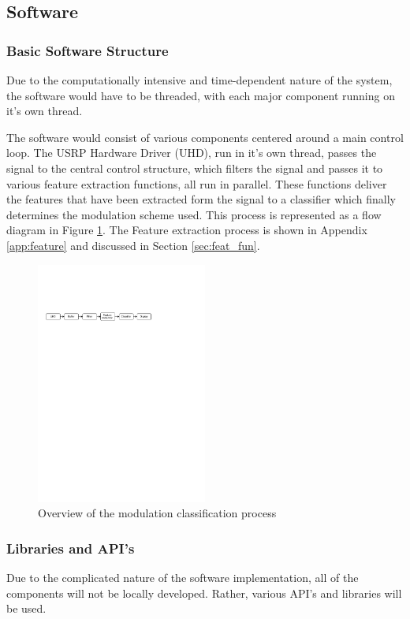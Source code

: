 \documentclass[10pt,twocolumn]{witseiepaper}
\begin{document}
	\subsection{Software}
		\subsubsection{Basic Software Structure}
			Due to the computationally intensive and time-dependent nature of the system, the software would have to be threaded, with each major component running on it's own thread.

			The software would consist of various components centered around a main control loop. The USRP Hardware Driver (UHD), run in it's own thread, passes the signal to the central control structure, which filters the signal and passes it to various feature extraction functions, all run in parallel. These functions deliver the features that have been extracted form the signal to a classifier which finally determines the modulation scheme used. This process is represented as a flow diagram in Figure \ref{fig:sw_overview}. The Feature extraction process is shown in Appendix \ref{app:feature} and discussed in Section \ref{sec:feat_fun}.

			\begin{figure}[h!]
				\centering
				\includegraphics[trim=1.2cm 31.5cm 9cm 8cm, clip=true,width=0.5\textwidth]{small.pdf}
				\caption{Overview of the modulation classification process}
				\label{fig:sw_overview}
			\end{figure}

		\subsubsection{Libraries and API's}
			Due to the complicated nature of the software implementation, all of the components will not be locally developed. Rather, various API's and libraries will be used.
\end{document}
